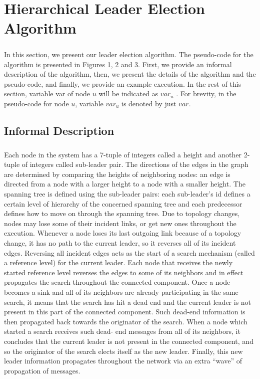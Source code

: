 \chapter{Hierarchical Leader Election Algorithm}
\paragraph{}In this section, we present our leader election algorithm. The pseudo-code for the algorithm is presented in Figures 1, 2 and 3. First, we provide an informal description of the algorithm, then, we present the details of the algorithm and the pseudo-code, and finally, we provide an example execution. In the rest of this section, variable var of node $u$ will be indicated as $var_u$ . For brevity, in the pseudo-code for node $u$, variable $var_u$ is denoted by just $var$.
\section{Informal Description}
\paragraph{}Each node in the system has a 7-tuple of integers called a height and another 2-tuple of integers called sub-leader pair. The directions of the edges in the graph are determined by comparing the heights of neighboring nodes: an edge is directed from a node with a larger height to a node with a smaller height. The spanning tree is defined using the sub-leader pairs: each sub-leader’s id defines a certain level of hierarchy of the concerned spanning tree and each predecessor defines how to move on through the spanning tree. Due to topology changes, nodes may lose some of their incident links, or get new ones throughout the execution. Whenever a node loses its last outgoing link because of a topology change, it has no path to the current leader, so it reverses all of its incident edges. Reversing all incident edges acts as the start of a search mechanism (called a reference level) for the current leader. Each node that receives the newly started reference level reverses the edges to some of its neighbors and in effect propagates the search throughout the connected component. Once a node becomes a sink and all of its neighbors are already participating in the same search, it means that the search has hit a dead end and the current leader is not present in this part of the connected component. Such dead-end information is then propagated back towards the originator of the search. When a node which started a search receives such dead- end messages from all of its neighbors, it concludes that the current leader is not present in the connected component, and so the originator of the search elects itself as the new leader. Finally, this new leader information propagates throughout the network via an extra “wave” of propagation of messages.
